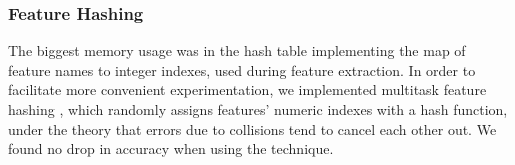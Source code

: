 \documentclass[11pt]{article}
\newcommand{\bocomment}[1]{\textcolor{Bittersweet}{[#1 -BTO]}}
\newcommand{\sam}[1]{\textcolor{blue}{[#1 -SMT]}}
\renewcommand{\bocomment}[1]{}
\renewcommand{\sam}[1]{}
\newcommand{\codenote}[1]{}
\begin{document}
\subsubsection{Feature Hashing}

  The biggest memory usage was in the hash table implementing the map
  of feature names to integer indexes, used during feature extraction.
  In order to facilitate more convenient experimentation, we
  implemented multitask feature hashing
  \cite{weinberger_feature_2009}, which randomly assigns features'
  numeric indexes with a hash function, under the theory that errors
  due to collisions tend to cancel each other out.  We found no
  drop in accuracy when using the technique.


\end{document}
